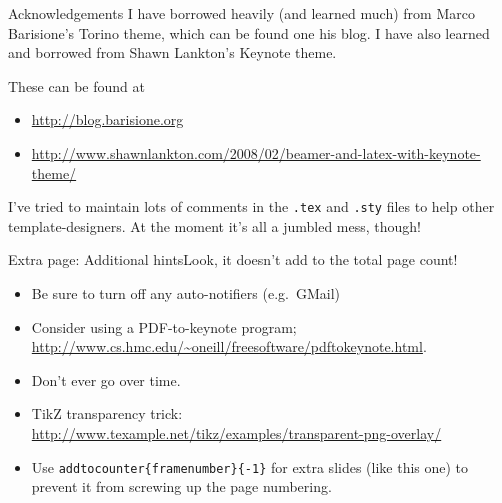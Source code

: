 \begin{frame}[t]{Acknowledgements}
	I have borrowed heavily (and learned much) from Marco Barisione's \alert{Torino theme}, which can be found one his blog. I have also learned and borrowed from Shawn Lankton's Keynote theme. 
	
	\vspace{1em}
	These can be found at
	\begin{itemize}
		\item \url{http://blog.barisione.org}
		\item \footnotesize{\url{http://www.shawnlankton.com/2008/02/beamer-and-latex-with-keynote-theme/}}
	\end{itemize}
	
	\vspace{1em}
	I've tried to maintain lots of comments in the \texttt{.tex} and \texttt{.sty} files to help other template-designers. At the moment it's all a jumbled mess, though!
\end{frame}



\addtocounter{framenumber}{-1}
\begin{frame}[c]{Extra page: Additional hints}{Look, it doesn't add to the total page count!}
	\begin{itemize}
		\item Be sure to turn off any auto-notifiers (e.g.\ GMail)
		\item Consider using a PDF-to-keynote program; \url{http://www.cs.hmc.edu/~oneill/freesoftware/pdftokeynote.html}.
		\item Don't ever go over time.
		\item TikZ transparency trick: \url{http://www.texample.net/tikz/examples/transparent-png-overlay/}
		\item Use \alert{\texttt{addtocounter\{framenumber\}\{-1\}}} for extra slides (like this one) to prevent it from screwing up the page numbering.
	\end{itemize}
\end{frame}

